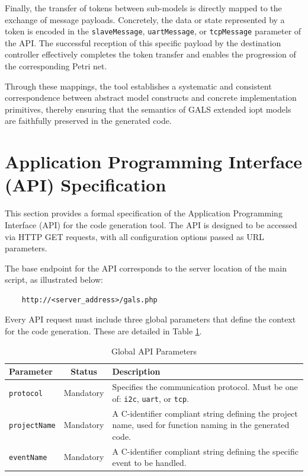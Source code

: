 Finally, the transfer of tokens between sub-models is directly mapped to the exchange of message payloads. Concretely, the data or state represented by a token is encoded in the \texttt{slaveMessage}, \texttt{uartMessage}, or \texttt{tcpMessage} parameter of the API. The successful reception of this specific payload by the destination controller effectively completes the token transfer and enables the progression of the corresponding Petri net.

Through these mappings, the tool establishes a systematic and consistent correspondence between abstract model constructs and concrete implementation primitives, thereby ensuring that the semantics of GALS extended \gls{iopt} models are faithfully preserved in the generated code.



\section{Application Programming Interface (API) Specification}
\label{sec:api_spec}

This section provides a formal specification of the Application Programming Interface (API) for the code generation tool. The API is designed to be accessed via HTTP GET requests, with all configuration options passed as URL parameters.

The base endpoint for the API corresponds to the server location of the main script, as illustrated below:
\begin{verbatim}
    http://<server_address>/gals.php
\end{verbatim}

Every API request must include three global parameters that define the context for the code generation. These are detailed in Table \ref{tab:global_params}.

\begin{table}[h!]
    \centering
    \caption{Global API Parameters}
    \label{tab:global_params}
    \begin{tabular}{|l|c|p{9cm}|}
        \hline
        \textbf{Parameter} & \textbf{Status} & \textbf{Description} \\ \hline
        \texttt{protocol} & Mandatory & Specifies the communication protocol. Must be one of: \texttt{\gls{i2c}}, \texttt{uart}, or \texttt{tcp}. \\ \hline
        \texttt{projectName} & Mandatory & A C-identifier compliant string defining the project name, used for function naming in the generated code. \\ \hline
        \texttt{eventName} & Mandatory & A C-identifier compliant string defining the specific event to be handled. \\ \hline
    \end{tabular}
\end{table}

